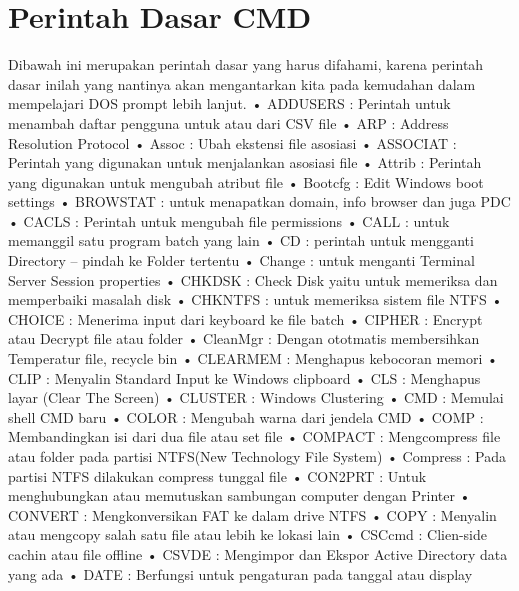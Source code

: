 \documentclass{article}
\begin{document}
\section{Perintah Dasar CMD}
Dibawah ini merupakan perintah dasar yang harus difahami, karena perintah dasar inilah yang nantinya akan mengantarkan kita pada kemudahan dalam mempelajari DOS prompt lebih lanjut.
• ADDUSERS : Perintah untuk menambah  daftar pengguna untuk atau dari CSV file
• ARP : Address Resolution Protocol
• Assoc : Ubah ekstensi file  asosiasi
• ASSOCIAT : Perintah yang digunakan untuk menjalankan asosiasi file
• Attrib : Perintah yang digunakan untuk mengubah atribut file
• Bootcfg : Edit Windows boot settings
• BROWSTAT : untuk menapatkan domain, info browser dan juga PDC
• CACLS : Perintah untuk mengubah file permissions
• CALL : untuk memanggil satu program batch yang lain
• CD : perintah untuk mengganti Directory – pindah ke Folder tertentu
• Change : untuk menganti Terminal Server Session properties
• CHKDSK : Check Disk yaitu untuk memeriksa dan memperbaiki masalah disk
• CHKNTFS : untuk memeriksa sistem file NTFS
• CHOICE : Menerima input dari keyboard ke file batch
• CIPHER : Encrypt atau Decrypt file atau folder
• CleanMgr : Dengan ototmatis membersihkan Temperatur file, recycle bin
• CLEARMEM : Menghapus kebocoran memori
• CLIP : Menyalin Standard Input ke Windows clipboard
• CLS : Menghapus layar (Clear The Screen)
• CLUSTER : Windows Clustering
• CMD : Memulai shell CMD baru
• COLOR : Mengubah warna dari jendela CMD
• COMP : Membandingkan isi dari dua file atau set file
• COMPACT : Mengcompress file atau folder pada partisi NTFS(New Technology File System)
• Compress : Pada partisi NTFS dilakukan compress tunggal file
• CON2PRT : Untuk menghubungkan atau memutuskan sambungan computer dengan Printer 
• CONVERT : Mengkonversikan FAT ke dalam drive NTFS 
• COPY : Menyalin atau mengcopy salah satu file atau lebih ke lokasi lain 
• CSCcmd : Clien-side cachin atau file offline
• CSVDE : Mengimpor dan Ekspor Active Directory data yang ada
• DATE : Berfungsi untuk pengaturan pada tanggal atau display
\end{document}
